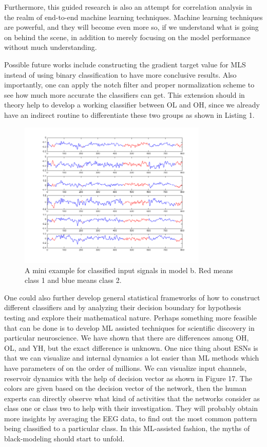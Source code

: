 \documentclass[a4paper,11pt,oneside]{article}
\begin{document}
Furthermore, this guided research is also an attempt for correlation analysis in the realm of end-to-end machine learning techniques. Machine learning techniques are powerful, and they will become even more so, if we understand what is going on behind the scene, in addition to merely focusing on the model performance without much understanding. 

Possible future works include constructing the gradient target value for MLS instead of using binary classification to have more conclusive results. Also importantly, one can apply the notch filter and proper normalization scheme to see how much more accurate the classifiers can get. This extension should in theory help to develop a working classifier between OL and OH, since we already have an indirect routine to differentiate these two groups as shown in Listing 1. 

\begin{figure}[h!]
	\centering
	\includegraphics[width=0.8\textwidth]{img/futureVisu}
	\caption{A mini example for classified input signals in model b. Red means class 1 and blue means class 2.  }
\end{figure}
One could also further develop general statistical frameworks of how to construct different classifiers and by analyzing their decision boundary for hypothesis testing and explore their mathematical nature. Perhaps something more feasible that can be done is to develop ML assisted techniques for scientific discovery in particular neuroscience. We have shown that there are differences among OH, OL, and YH, but the exact difference is unknown. One nice thing about ESNs is that we can visualize and internal dynamics a lot easier than ML methods which have parameters of on the order of millions. We can visualize input channels, reservoir dynamics with the help of decision vector as shown in Figure 17. The colors are given based on the decision vector of the network, then the human experts can directly observe what kind of activities that the networks consider as class one or class two to help with their investigation. They will probably obtain more insights by averaging the EEG data, to find out the most common pattern being classified to a particular class. In this ML-assisted fashion, the myths of black-modeling should start to unfold.
\end{document}
